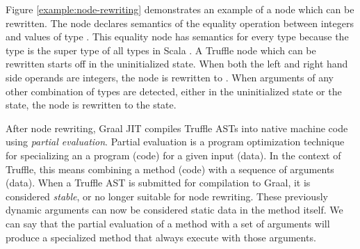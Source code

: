 Figure \ref{example:node-rewriting} demonstrates an example of a node which can be rewritten.
The node declares semantics of the equality operation between integers and values of type .
This equality node has semantics for every type because the  type is the super type of all types in Scala .
A Truffle node which can be rewritten starts off in the uninitialized state.
When both the left and right hand side operands are integers, the node is rewritten to .
When arguments of any other combination of types are detected, either in the uninitialized state or the  state, the node is rewritten to the  state.

After node rewriting, Graal JIT compiles Truffle ASTs into native machine code using \textit{partial evaluation}.
Partial evaluation is a program optimization technique for specializing an a program (code) for a given input (data)\cite{futamura:partial-eval}.
In the context of Truffle, this means combining a method (code) with a sequence of arguments (data)\cite{truffle:partial-eval}.
When a Truffle AST is submitted for compilation to Graal, it is considered \textit{stable}, or no longer suitable for node rewriting.
These previously dynamic arguments can now be considered static data in the method itself.
We can say that the partial evaluation of a method with a set of arguments will produce a specialized method that always execute with those arguments.
